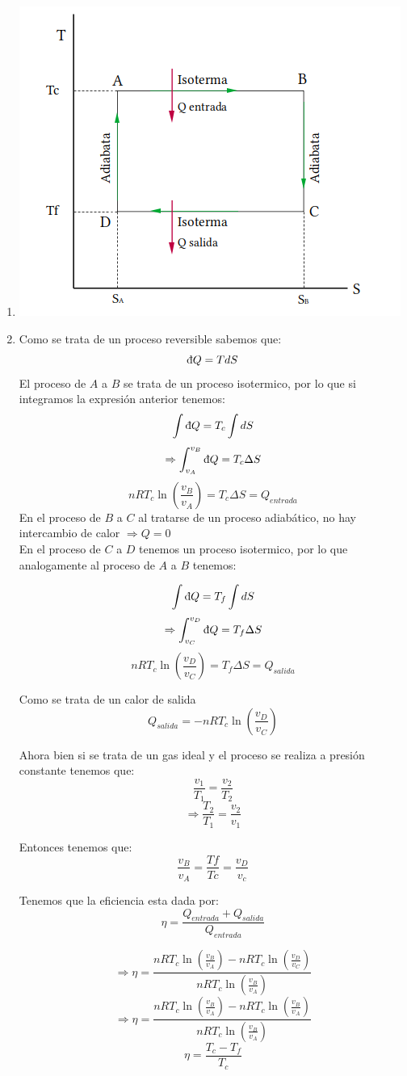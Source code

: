 \begin{enumerate}
    \item  \includegraphics*[H]{T-S.png}
    \item  Como se trata de un proceso reversible  sabemos que:
    \[ \dbar Q =TdS \]
   El proceso de $A$ a $B$ se trata de un proceso isotermico, por lo que si integramos la expresión anterior tenemos:
   \[ \int \dbar Q =T_{c}\int dS \]
   \[ \Rightarrow \int _{v_A} ^{v_B} \dbar Q = T_{c} \Delta S\]
   \[nRT_c \ln \left( \frac{v_B}{v_A}\right) = T_{c}\Delta S = Q_{entrada}\]
    En el proceso de $B$ a $C$ al tratarse de un proceso adiabático, no hay intercambio de calor $\Rightarrow Q=0$\\

    En  el proceso de $C$ a $D$ tenemos un proceso isotermico, por lo que analogamente al proceso de $A$ a $B$ tenemos:

\[ \int \dbar Q =T_{f}\int dS \]
   \[ \Rightarrow \int _{v_C} ^{v_D} \dbar Q = T_{f} \Delta S\]
   \[nRT_c \ln \left( \frac{v_D}{v_C}\right) = T_{f}\Delta S = Q_{salida}\]

Como se trata de un calor de salida 
\[Q_{salida}=-nRT_c \ln \left( \frac{v_D}{v_C}\right)\]
  

   Ahora bien si  se trata de un gas ideal y el proceso se realiza a presión constante tenemos que:
   \[ \frac{v_1}{T_1}=\frac{v_2}{T_2}\]
   \[\Rightarrow \frac{T_2}{T_1}=\frac{v_2}{v_1}\]

Entonces tenemos que:
\[ \frac{v_B}{v_A}=\frac{Tf}{Tc}=\frac{v_D}{v_c}\]

Tenemos que la eficiencia esta dada por:
\[ \eta = \frac{Q_{entrada}+ Q_{salida}}{Q_{entrada}}\]

\[\Rightarrow  \eta = \frac{nRT_c \ln \left( \frac{v_B}{v_A}\right)-nRT_c \ln \left( \frac{v_D}{v_C}\right)}{nRT_c \ln \left( \frac{v_B}{v_A}\right)}\]
\[\Rightarrow  \eta = \frac{nRT_c \ln \left( \frac{v_B}{v_A}\right)-nRT_c \ln \left( \frac{v_B}{v_A}\right)}{nRT_c \ln \left( \frac{v_B}{v_A}\right)}\]
\[\eta =\frac{T_c-T_f}{T_c}\]





\end{enumerate}
